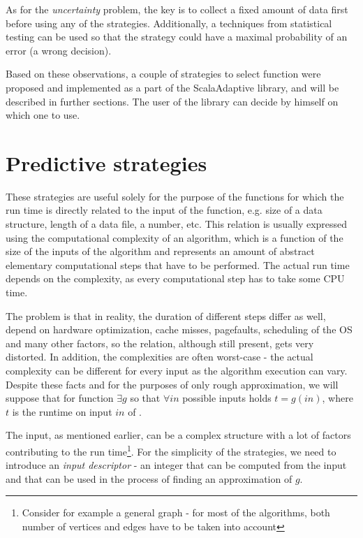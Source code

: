 As for the \textit{uncertainty} problem, the key is to collect a fixed amount of data first before using any of the strategies. Additionally, a techniques from statistical testing can be used so that the strategy could have a maximal probability of an error (a wrong decision).

Based on these observations, a couple of strategies to select function were proposed and implemented as a part of the ScalaAdaptive library, and will be described in further sections. The user of the library can decide by himself on which one to use.

\section{Predictive strategies}
\label{sec:predictive_strategies}

These strategies are useful solely for the purpose of the functions for which the run time is directly related to the input of the function, e.g. size of a data structure, length of a data file, a number, etc. This relation is usually expressed using the computational complexity of an algorithm, which is a function of the size of the inputs of the algorithm and represents an amount of abstract elementary computational steps that have to be performed. The actual run time depends on the complexity, as every computational step has to take some CPU time. 

The problem is that in reality, the duration of different steps differ as well, depend on hardware optimization, cache misses, pagefaults, scheduling of the OS and many other factors, so the relation, although still present, gets very distorted. In addition, the complexities are often worst-case - the actual complexity can be different for every input as the algorithm execution can vary. Despite these facts and for the purposes of only rough approximation, we will suppose that for function  \(\exists g\) so that 
\(\forall in\) possible inputs holds \(t = g(in)\), where \(t\) is the runtime on input \(in\) of .

The input, as mentioned earlier, can be a complex structure with a lot of factors contributing to the run time\footnote{Consider for example a general graph - for most of the algorithms, both number of vertices and edges have to be taken into account}. For the simplicity of the strategies, we need to introduce an \textit{input descriptor} - an integer that can be computed from the input and that can be used in the process of finding an approximation of $g$. 

